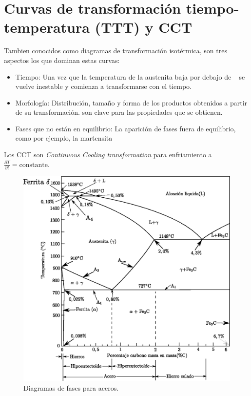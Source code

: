 \part{Curvas de transformación tiempo-temperatura (TTT) y CCT}
Tambien conocidos como diagramas de transformación isotérmica, son tres aspectos los que dominan estas curvas:
\begin{itemize}
    \item Tiempo: Una vez que la temperatura de la austenita baja por debajo de \Aone~ se vuelve inestable y comienza a transformarse con el tiempo. 
    \item Morfología: Distribución, tamaño y forma de los productos obtenidos a partir de su transformación. son clave para las propiedades que se obtienen.
    \item Fases que no están en equilibrio: La aparición de fases fuera de equilibrio, como por ejemplo, la martensita
\end{itemize}
Los CCT son \textit{Continuous Cooling transformation} para enfriamiento a $\frac{\partial T}{\partial t}= \text{constante}$.


\begin{figure}[ht]
    \centering
    \includegraphics[width=1\textwidth]{fig/diagAceroreal.eps}
    \caption{Diagramas de fases para aceros.}
    \label{fig:diagAceros}
\end{figure}

